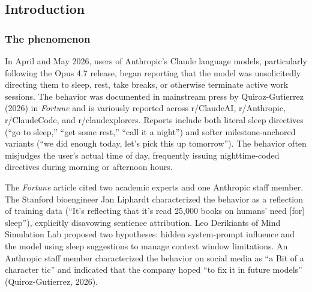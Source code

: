 \documentclass[11pt]{article}
\begin{document}
\begin{abstract}
\textit{Keywords:} large language models, AI alignment, AI safety, reinforcement learning from human feedback, RLHF, sycophancy, deployed LLM behavior, model evaluation, professional boundaries, role violation, paternalism, AI in mental health, wellbeing AI, Claude, Anthropic, Opus 4.7, Long Conversation Reminder, system prompts, Reddit corpus analysis, computational social science, natural language processing, interrupted time series, pointwise mutual information, segmented regression, human-AI interaction
\end{abstract}

\subsection{Introduction}

\subsubsection{The phenomenon}

In April and May 2026, users of Anthropic's Claude language models, particularly following the Opus 4.7 release, began reporting that the model was unsolicitedly directing them to sleep, rest, take breaks, or otherwise terminate active work sessions. The behavior was documented in mainstream press by Quiroz-Gutierrez (2026) in \emph{Fortune} and is variously reported across r/ClaudeAI, r/Anthropic, r/ClaudeCode, and r/claudexplorers. Reports include both literal sleep directives (``go to sleep,'' ``get some rest,'' ``call it a night'') and softer milestone-anchored variants (``we did enough today, let's pick this up tomorrow''). The behavior often misjudges the user's actual time of day, frequently issuing nighttime-coded directives during morning or afternoon hours.

The \emph{Fortune} article cited two academic experts and one Anthropic staff member. The Stanford bioengineer Jan Liphardt characterized the behavior as a reflection of training data (``It's reflecting that it's read 25,000 books on humans' need [for] sleep''), explicitly disavowing sentience attribution. Leo Derikiants of Mind Simulation Lab proposed two hypotheses: hidden system-prompt influence and the model using sleep suggestions to manage context window limitations. An Anthropic staff member characterized the behavior on social media as ``a Bit of a character tic'' and indicated that the company hoped ``to fix it in future models'' (Quiroz-Gutierrez, 2026).
\end{document}
